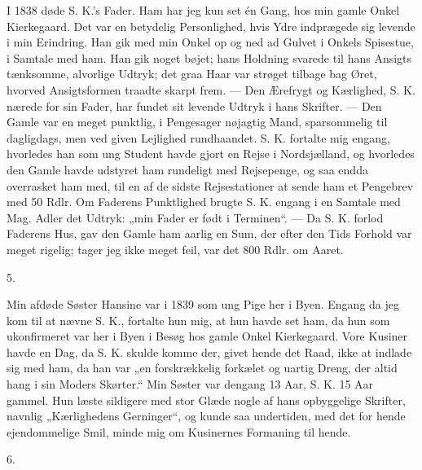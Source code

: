 \documentclass[12pt,a4paper,openany]{book}
\newcommand{\secnum}[1]{\par\begin{center}#1\end{center}\par\nobreak}
\newcommand{\opage}[1]{\marginnote{\footnotesize\textit{[#1]}}}
\begin{document}
I 1838 døde S. K.’s Fader. Ham har jeg kun set
én Gang, hos min gamle Onkel Kierkegaard. Det var
en betydelig Personlighed, hvis Ydre indprægede sig levende
i min Erindring. Han gik med min Onkel op og ned
ad Gulvet i Onkels Spisestue, i Samtale med ham. Han
gik noget bøjet; hans Holdning svarede til hans Ansigts
tænksomme, alvorlige Udtryk; det graa Haar var strøget
tilbage bag Øret, hvorved Ansigtsformen traadte skarpt
frem. --- Den Ærefrygt og Kærlighed, S. K. nærede for
sin Fader, har fundet sit levende Udtryk i hans Skrifter.
--- Den Gamle var en meget punktlig, i Pengesager nøjagtig
Mand, sparsommelig til dagligdags, men ved given
Lejlighed rundhaandet. S. K. fortalte mig engang, hvorledes
han som ung Student havde gjort en Rejse i Nordsjælland,
og hvorledes den Gamle havde udstyret ham
rundeligt med Rejsepenge, og saa endda overrasket ham
med, til en af de sidste Rejsestationer at sende ham et
Pengebrev med 50 Rdlr. Om Faderens Punktlighed brugte
S. K. engang i en Samtale med Mag. Adler det Udtryk:
„min Fader er født i Terminen“. --- Da S. K. forlod
Faderens Hus, gav den Gamle ham aarlig en Sum, der
efter den Tids Forhold var meget rigelig; tager jeg ikke
meget feil, var det 800 Rdlr. om Aaret.

\secnum{5.}

Min afdøde Søster Hansine var i 1839 som ung Pige
her i Byen. Engang da jeg kom til at nævne S. K.,
fortalte hun mig, at hun havde set ham, da hun som
ukonfirmeret var her i Byen i Besøg hos gamle Onkel
\opage{341}Kierkegaard. Vore Kusiner havde en Dag, da S. K.
skulde komme der, givet hende det Raad, ikke at indlade
sig med ham, da han var „en forskrækkelig forkælet
og uartig Dreng, der altid hang i sin Moders Skørter.“
Min Søster var dengang 13 Aar, S. K. 15 Aar gammel.
Hun læste sildigere med stor Glæde nogle af hans opbyggelige
Skrifter, navnlig „Kærlighedens Gerninger“, og
kunde saa undertiden, med det for hende ejendommelige
Smil, minde mig om Kusinernes Formaning til hende.

\secnum{6.}
\end{document}
